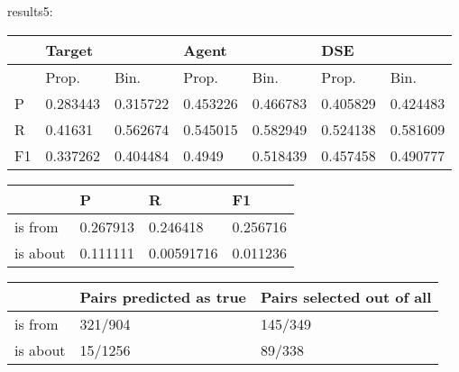 \documentclass[a4paper, 12pt]{article}
\begin{document}
results5:\\
\begin{table}[h!]
\centering
\begin{tabular}{l|ll|ll|ll}
\hline
   & \multicolumn{2}{l}{Target} & \multicolumn{2}{l}{Agent} & \multicolumn{2}{l}{DSE} \\ \hline
   & Prop.& Bin.& Prop.& Bin.& Prop.& Bin.\\
 \hline
P  &0.283443&0.315722& 0.453226 & 0.466783 &0.405829  & 0.424483  \\
R  & 0.41631&0.562674& 0.545015 & 0.582949 &0.524138  & 0.581609  \\
F1 &0.337262&0.404484&   0.4949 & 0.518439 &0.457458  & 0.490777  \\ \hline
\end{tabular}
\centering
\begin{tabular}{l|l|l|l}
\hline
         & P & R & F1    \\\hline
is from  & 0.267913& 0.246418& 0.256716\\
is about &0.111111& 0.00591716&   0.011236\\
\hline
\end{tabular}
\begin{tabular}{l|l|l}
\hline
         & Pairs predicted as true & Pairs selected out of all\\\hline
is from  & 321/904& 145/349 \\
is about & 15/1256& 89/338\\
\hline
\end{tabular}
\end{table}
\end{document}
